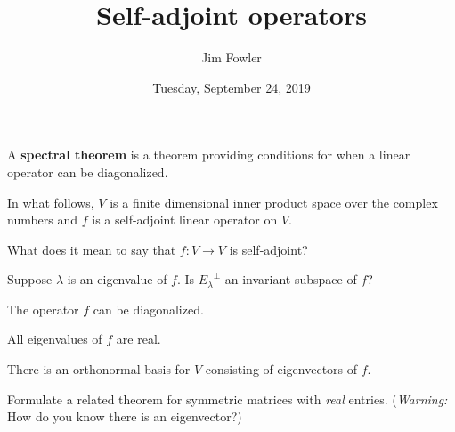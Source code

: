 \documentclass{homework}
\author{Jim Fowler}
\title{Self-adjoint operators}
\date{Tuesday, September 24, 2019}
\begin{document}
\maketitle

A \textbf{spectral theorem} is a theorem providing conditions for when
a linear operator can be diagonalized.

In what follows, $V$ is a finite dimensional inner product space over
the complex numbers and $f$ is a self-adjoint linear operator on $V$.

\begin{problem}
  What does it mean to say that $f : V \to V$ is self-adjoint?
\end{problem}

\vfill

\begin{problem}
  Suppose $\lambda$ is an eigenvalue of $f$.  Is ${E_\lambda}^\perp$ an invariant subspace of $f$?
\end{problem}

\vfill

\begin{problem}
  The operator $f$ can be diagonalized.
\end{problem}

\vfill

\begin{problem}
  All eigenvalues of $f$ are real.
\end{problem}

\vfill

\begin{problem}
  There is an orthonormal basis for $V$ consisting of eigenvectors of $f$.
\end{problem}

\vfill

\begin{problem}
  Formulate a related theorem for symmetric matrices with
  \textit{real} entries.  (\textit{Warning:} How do you know there is an eigenvector?)
\end{problem}

\vfill
\end{document}
